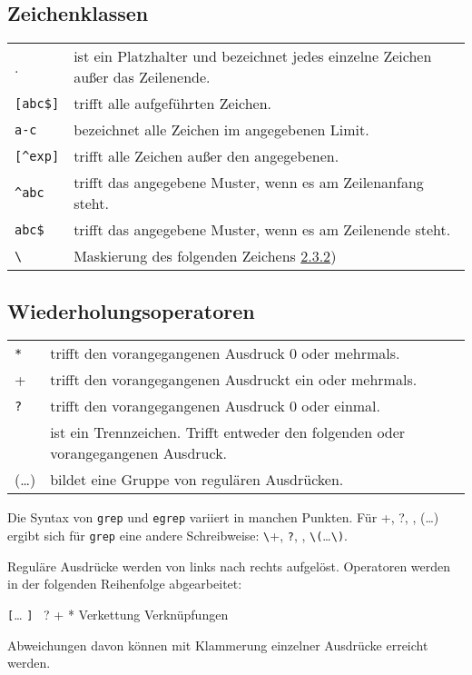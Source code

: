 \documentclass[12pt,]{article}
\begin{document}
\subsection{Zeichenklassen}\label{zeichenklassen}

\begin{longtable}[c]{@{}ll@{}}
\toprule
. & ist ein Platzhalter und bezeichnet jedes einzelne Zeichen außer das
Zeilenende.\tabularnewline
\texttt{{[}abc\${]}} & trifft alle aufgeführten Zeichen.\tabularnewline
\texttt{a-c} & bezeichnet alle Zeichen im angegebenen
Limit.\tabularnewline
\texttt{{[}\^{}exp{]}} & trifft alle Zeichen außer den
angegebenen.\tabularnewline
\texttt{\^{}abc} & trifft das angegebene Muster, wenn es am Zeilenanfang
steht.\tabularnewline
\texttt{abc\$} & trifft das angegebene Muster, wenn es am Zeilenende
steht.\tabularnewline
\texttt{\textbackslash{}} & Maskierung des folgenden Zeichens
\href{node3.html\#ssec:quotierung}{2.3.2})\tabularnewline
\bottomrule
\end{longtable}

\subsection{Wiederholungsoperatoren}\label{wiederholungsoperatoren}

\begin{longtable}[c]{@{}ll@{}}
\toprule
\texttt{*} & trifft den vorangegangenen Ausdruck 0 oder
mehrmals.\tabularnewline
+ & trifft den vorangegangenen Ausdruckt ein oder
mehrmals.\tabularnewline
\texttt{?} & trifft den vorangegangenen Ausdruck 0 oder
einmal.\tabularnewline
\texttt{\textbar{}} & ist ein Trennzeichen. Trifft entweder den
folgenden oder vorangegangenen Ausdruck.\tabularnewline
(\ldots{}) & bildet eine Gruppe von regulären Ausdrücken.\tabularnewline
\bottomrule
\end{longtable}

Die Syntax von \texttt{grep} und \texttt{egrep} variiert in manchen
Punkten. Für +, ?, \textbar{}, (\ldots{}) ergibt sich für \texttt{grep}
eine andere Schreibweise: \texttt{\textbackslash{}}+, \texttt{?},
\texttt{\textbar{}},
\texttt{\textbackslash{}(}\ldots{}\texttt{\textbackslash{})}.

Reguläre Ausdrücke werden von links nach rechts aufgelöst. Operatoren
werden in der folgenden Reihenfolge abgearbeitet:

\texttt{{[}}\ldots{} \texttt{{]}}~ ? + * Verkettung Verknüpfungen
\textbar{}

Abweichungen davon können mit Klammerung einzelner Ausdrücke erreicht
werden.
\end{document}
